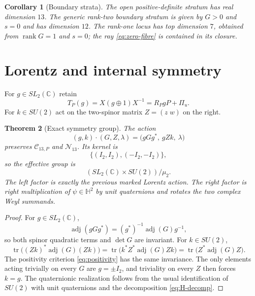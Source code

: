 \documentclass[11pt]{article}
\newtheorem{theorem}{Theorem}[section]
\newtheorem{corollary}[theorem]{Corollary}
\theoremstyle{definition}
\theoremstyle{remark}
\newcommand{\C}{\mathbb C}
\newcommand{\Hh}{\mathbb H}
\newcommand{\rank}{\operatorname{rank}}
\newcommand{\tr}{\operatorname{tr}}
\newcommand{\adj}{\operatorname{adj}}
\newcommand{\cC}{\mathcal C}
\newcommand{\cN}{\mathcal N}
\begin{document}
\begin{corollary}[Boundary strata]\label{cor:strata}
The open positive-definite stratum has real dimension $13$.  The generic rank-two boundary stratum is given by $G>0$ and $s=0$ and has dimension $12$.  The rank-one locus has top dimension $7$, obtained from $\rank G=1$ and $s=0$; the ray \eqref{eq:zero-fibre} is contained in its closure.
\end{corollary}

\section{Lorentz and internal symmetry}

For $g\in SL_2(\C)$ retain
\begin{equation}\label{eq:TP}
 T_P(g)=X(g\oplus1)X^{-1}=R_PgP+\Pi_u.
\end{equation}
For $k\in SU(2)$ act on the two-spinor matrix $Z=(z\;w)$ on the right.

\begin{theorem}[Exact symmetry group]\label{thm:symmetry}
The action
\begin{equation}\label{eq:group-action}
 (g,k)\cdot(G,Z,\lambda)
 =\bigl(gGg^*,\ gZk,\ \lambda\bigr)
\end{equation}
preserves $\cC_{13,P}$ and $\cN_{13}$.  Its kernel is
\begin{equation}\label{eq:group-kernel}
 \{(I_2,I_2),(-I_2,-I_2)\},
\end{equation}
so the effective group is
\begin{equation}\label{eq:effective-group}
 \boxed{(SL_2(\C)\times SU(2))/\mu_2.}
\end{equation}
The left factor is exactly the previous marked Lorentz action.  The right factor is right multiplication of $\psi\in\Hh^2$ by unit quaternions and rotates the two complex Weyl summands.
\end{theorem}

\begin{proof}
For $g\in SL_2(\C)$,
\[
 \adj(gGg^*)=(g^*)^{-1}\adj(G)g^{-1},
\]
so both spinor quadratic terms and $\det G$ are invariant.  For $k\in SU(2)$,
\[
 \tr\bigl((Zk)^*\adj(G)(Zk)\bigr)
 =\tr\bigl(k^*Z^*\adj(G)Zk\bigr)
 =\tr\bigl(Z^*\adj(G)Z\bigr).
\]
The positivity criterion \eqref{eq:positivity} has the same invariance.  The only elements acting trivially on every $G$ are $g=\pm I_2$, and triviality on every $Z$ then forces $k=g$.  The quaternionic realization follows from the usual identification of $SU(2)$ with unit quaternions and the decomposition \eqref{eq:H-decomp}.
\end{proof}
\end{document}
